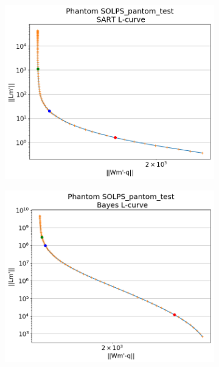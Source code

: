 \begin{figure}
     \begin{subfigure}{0.45\linewidth}
         \centering
         \includegraphics[trim={0 0 0 45},clip,width=\textwidth]{Chapters/chapter2/figs/inversion_comparison_L_curve_SOLPS_pantom_test-SART.png}
         \caption{}
         \label{fig:SOLPS_phantom2a}
     \end{subfigure}
     \hfill
     \begin{subfigure}{0.45\linewidth}
         \centering
         \includegraphics[trim={0 0 0 45},clip,width=\textwidth]{Chapters/chapter2/figs/inversion_comparison_L_curve_SOLPS_pantom_test-Bayes.png}

\end{subfigure}
\end{figure}
